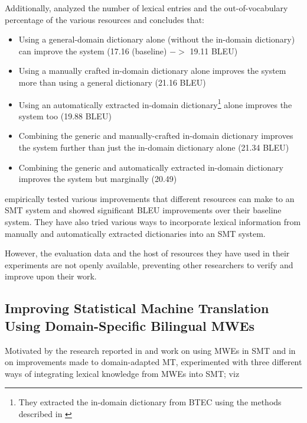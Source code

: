 Additionally, \cite{wu2008domain} analyzed the number of lexical entries and the out-of-vocabulary percentage of the various resources and concludes that:

\begin{itemize}
\item Using a general-domain dictionary alone (without the in-domain dictionary) can improve the system (17.16 (baseline) $->$ 19.11 BLEU)
\item Using a manually crafted in-domain dictionary alone improves the system more than using a general dictionary (21.16 BLEU)
\item Using an automatically extracted in-domain dictionary\footnote{They extracted the in-domain dictionary from BTEC using the methods described in \cite{wu2007comparative}} alone improves the system too (19.88 BLEU)
\item Combining the generic and manually-crafted in-domain dictionary improves the system further than just the in-domain dictionary alone (21.34 BLEU)
\item Combining the generic and automatically extracted in-domain dictionary improves the system but marginally (20.49)
\end{itemize}

\cite{wu2008domain} empirically tested various improvements that different resources can make to an SMT system and showed significant BLEU improvements over their baseline system. They have also tried various ways to incorporate lexical information from manually and automatically extracted dictionaries into an SMT system. 

However, the evaluation data and the host of resources they have used in their experiments are not openly available, preventing other researchers to verify and improve upon their work. 


\subsection{Improving Statistical Machine Translation Using Domain-Specific Bilingual MWEs}

Motivated by the research reported in \cite{lambert2006grouping} and \cite{wu2008domain} work on using MWEs in SMT and in \cite{Koehn2007domain} on  improvements made to domain-adapted MT, \cite{ren2009improving} experimented with three different ways of integrating lexical knowledge from MWEs into SMT; viz 

